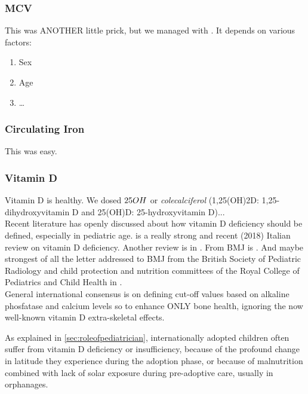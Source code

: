 \subsubsection{MCV}\label{sub:mcv}
This was ANOTHER little prick, but we managed with \cite{MCVferritincutoff}. It depends on various factors:

\begin{enumerate}
	\item Sex
	\item Age
	\item \dots
\end{enumerate}


\subsubsection{Circulating Iron}\label{sub:iron}
This was easy.


\subsubsection{Vitamin D}\label{sub:vitaminD}
Vitamin D is healthy. We dosed $25\-OH$ or \textit{colecalciferol} (1,25(OH)2D: 1,25-dihydroxyvitamin D and 25(OH)D: 25-hydroxyvitamin D)...\\
Recent literature has openly discussed about how vitamin D deficiency should be defined, especially in pediatric age. \cite{vitDcutoff1} is a really strong and recent (2018) Italian review on vitamin D deficiency. Another review is in \cite{vitDcutoff2}. From BMJ is \cite{vitDcutoff3}. And maybe strongest of all the letter addressed to BMJ from the British Society of Pediatric Radiology and child protection and nutrition committees of the Royal College of Pediatrics and Child Health in \cite{vitDcutoff_letter}.\\
General international consensus is on defining cut-off values based on alkaline phosfatase and calcium levels so to enhance ONLY bone health, ignoring the now well-known vitamin D extra-skeletal effects.

As explained in \ref{sec:roleofpediatrician}, internationally adopted children often suffer from vitamin D deficiency or insufficiency, because of the profound change in latitude they experience during the adoption phase, or because of malnutrition combined with lack of solar exposure during pre-adoptive care, usually in orphanages.

